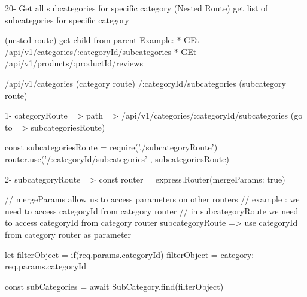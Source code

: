 20- Get all subcategories for specific category (Nested Route)  
    get list of subcategories for specific category

    (nested route)
    get child from parent 
    Example:
    * GEt /api/v1/categories/:categoryId/subcategories
    * GEt /api/v1/products/:productId/reviews

    /api/v1/categories (category route)   /:categoryId/subcategories (subcategory route)

    1- categoryRoute =>   
          path =>   /api/v1/categories/:categoryId/subcategories  (go to => subcategoriesRoute)

                      const subcategoriesRoute = require('./subcategoryRoute')
                      router.use('/:categoryId/subcategories' , subcategoriesRoute)


   2- subcategoryRoute => 
                        const router = express.Router({mergeParams: true})

                        // mergeParams allow us to access parameters on other routers 
                        // example : we need to access categoryId from category router
                        // in subcategoryRoute  we need to access categoryId from category router
                           subcategoryRoute => use categoryId from category router as parameter

                           let filterObject = {}
                           if(req.params.categoryId) filterObject = {category: req.params.categoryId}
                           
                           const subCategories = await SubCategory.find(filterObject)

